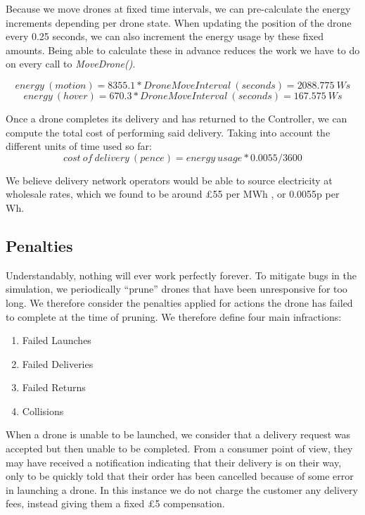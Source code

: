 \documentclass[a4paper,11pt,titlepage]{report}
\begin{document}
Because we move drones at fixed time intervals, we can pre-calculate the energy increments depending per drone state. When updating the position of the drone every 0.25 seconds, we can also increment the energy usage by these fixed amounts. Being able to calculate these in advance reduces the work we have to do on every call to \textit{MoveDrone()}.

\clearpage
$$ energy\ (motion) = 8355.1 * DroneMoveInterval\ (seconds) = 2088.775\ Ws $$
$$ energy\ (hover) = 670.3 * DroneMoveInterval\ (seconds) = 167.575\ Ws $$

Once a drone completes its delivery and has returned to the Controller, we can compute the total cost of performing said delivery. Taking into account the different units of time used so far:
$$ cost\ of\ delivery\ (pence) = energy\ usage * 0.0055 / 3600 $$

We believe delivery network operators would be able to source electricity at wholesale rates, which we found to be around £55 per MWh \cite{Ambrose2018}, or 0.0055p per Wh.

\subsection{Penalties}
Understandably, nothing will ever work perfectly forever. To mitigate bugs in the simulation, we periodically ``prune'' drones that have been unresponsive for too long. We therefore consider the penalties applied for actions the drone has failed to complete at the time of pruning. We therefore define four main infractions:
\begin{multicols}{2}
  \begin{enumerate}
    \item Failed Launches
    \item Failed Deliveries
    \item Failed Returns
    \item Collisions
  \end{enumerate}
\end{multicols}

When a drone is unable to be launched, we consider that a delivery request was accepted but then unable to be completed. From a consumer point of view, they may have received a notification indicating that their delivery is on their way, only to be quickly told that their order has been cancelled because of some error in launching a drone. In this instance we do not charge the customer any delivery fees, instead giving them a fixed £5 compensation.\\
\end{document}
